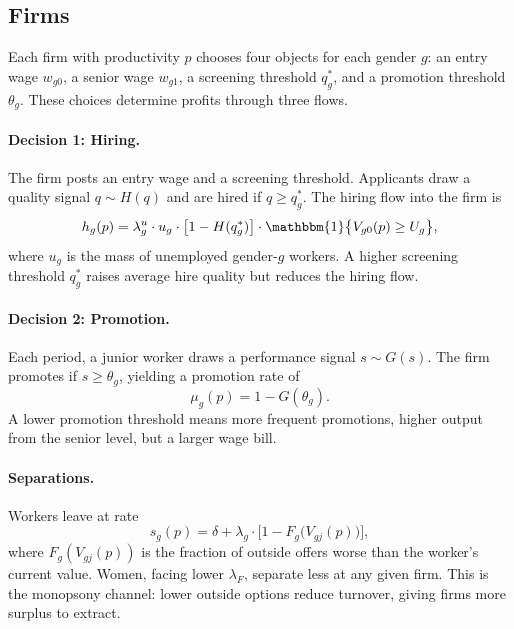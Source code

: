 \documentclass[11pt]{article}
\begin{document}
\subsection{Firms}

Each firm with productivity $p$ chooses four objects for each gender $g$: an entry wage $w_{g0}$, a senior wage $w_{g1}$, a screening threshold $q_g^*$, and a promotion threshold $\theta_g$. These choices determine profits through three flows.

\paragraph{Decision 1: Hiring.} The firm posts an entry wage and a screening threshold. Applicants draw a quality signal $q \sim H(q)$ and are hired if $q \geq q_g^*$. The hiring flow into the firm is
\begin{equation*}
    h_g(p) = \lambda_g^u \cdot u_g \cdot \bigl[1 - H(q_g^*)\bigr] \cdot \mathbbm{1}\bigl\{V_{g0}(p) \geq U_g\bigr\},
\end{equation*}
where $u_g$ is the mass of unemployed gender-$g$ workers. A higher screening threshold $q_g^*$ raises average hire quality but reduces the hiring flow.

\paragraph{Decision 2: Promotion.} Each period, a junior worker draws a performance signal $s \sim G(s)$. The firm promotes if $s \geq \theta_g$, yielding a promotion rate of
\begin{equation*}
    \mu_g(p) = 1 - G(\theta_g).
\end{equation*}
A lower promotion threshold means more frequent promotions, higher output from the senior level, but a larger wage bill.

\paragraph{Separations.} Workers leave at rate
\begin{equation*}
    s_g(p) = \delta + \lambda_g \cdot \bigl[1 - F_g\bigl(V_{gj}(p)\bigr)\bigr],
\end{equation*}
where $F_g(V_{gj}(p))$ is the fraction of outside offers worse than the worker's current value. Women, facing lower $\lambda_F$, separate less at any given firm. This is the monopsony channel: lower outside options reduce turnover, giving firms more surplus to extract.
\end{document}
